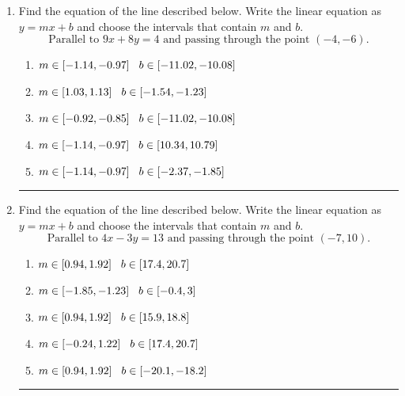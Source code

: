 \documentclass[14pt]{extbook}
\newcommand{\litem}[1]{\item#1\hspace*{-1cm}\rule{\textwidth}{0.4pt}}
\begin{document}
\begin{enumerate}
{\begin{enumerate}[label=\Alph*.]
\end{enumerate} }
\litem{
Find the equation of the line described below. Write the linear equation as $ y=mx+b $ and choose the intervals that contain $m$ and $b$.\[ \text{Parallel to } 9 x + 8 y = 4 \text{ and passing through the point } (-4, -6). \]\begin{enumerate}[label=\Alph*.]
\item \( m \in [-1.14, -0.97] \hspace*{3mm} b \in [-11.02, -10.08] \)
\item \( m \in [1.03, 1.13] \hspace*{3mm} b \in [-1.54, -1.23] \)
\item \( m \in [-0.92, -0.85] \hspace*{3mm} b \in [-11.02, -10.08] \)
\item \( m \in [-1.14, -0.97] \hspace*{3mm} b \in [10.34, 10.79] \)
\item \( m \in [-1.14, -0.97] \hspace*{3mm} b \in [-2.37, -1.85] \)

\end{enumerate} }
\litem{
Find the equation of the line described below. Write the linear equation as $ y=mx+b $ and choose the intervals that contain $m$ and $b$.\[ \text{Parallel to } 4 x - 3 y = 13 \text{ and passing through the point } (-7, 10). \]\begin{enumerate}[label=\Alph*.]
\item \( m \in [0.94, 1.92] \hspace*{3mm} b \in [17.4, 20.7] \)
\item \( m \in [-1.85, -1.23] \hspace*{3mm} b \in [-0.4, 3] \)
\item \( m \in [0.94, 1.92] \hspace*{3mm} b \in [15.9, 18.8] \)
\item \( m \in [-0.24, 1.22] \hspace*{3mm} b \in [17.4, 20.7] \)
\item \( m \in [0.94, 1.92] \hspace*{3mm} b \in [-20.1, -18.2] \)


\end{enumerate}}
\end{enumerate}
\end{document}
